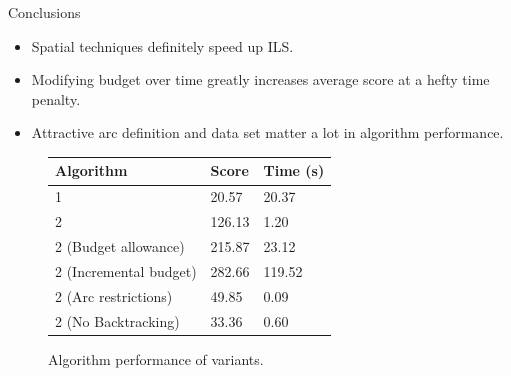 \documentclass{beamer}
\begin{document}

\begin{frame}{Conclusions}
    \begin{itemize}
        \item Spatial techniques definitely speed up ILS.
        \item Modifying budget over time greatly increases average score at a hefty time penalty.
        \item Attractive arc definition and data set matter a lot in algorithm performance.
    \end{itemize}
    
    \begin{center}
    \begin{figure}
    \begin{tabular}{|l|l|l|}
    \hline
    \textbf{Algorithm} & \textbf{Score} & \textbf{Time (s)} \\
    \hline
    1 & 20.57 & 20.37 \\
    \hline
    2 & 126.13 & 1.20 \\
    \hline
    2 (Budget allowance) & 215.87 & 23.12 \\
    \hline
    2 (Incremental budget) & 282.66 & 119.52 \\
    \hline
    2 (Arc restrictions) & 49.85 & 0.09 \\
    \hline
    2 (No Backtracking) & 33.36 & 0.60 \\
    \hline
    \end{tabular}
    \caption{Algorithm performance of variants.}
    \end{figure}
    \end{center}
\end{frame}
\end{document}
